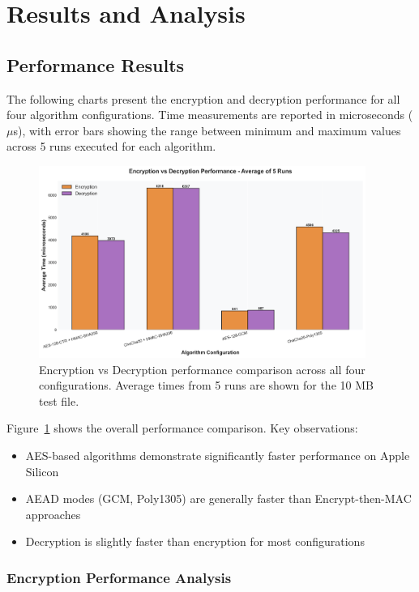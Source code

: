 \documentclass[12pt,a4paper]{article}
\begin{document}
\section{Results and Analysis}

\subsection{Performance Results}

The following charts present the encryption and decryption performance for all four algorithm configurations. Time measurements are reported in microseconds ($\mu$s), with error bars showing the range between minimum and maximum values across 5 runs executed for each algorithm.

\begin{figure}[h]
\centering
\includegraphics[width=0.95\textwidth]{performance_comparison.png}
\caption{Encryption vs Decryption performance comparison across all four configurations. Average times from 5 runs are shown for the 10 MB test file.}
\label{fig:perf_comparison}
\end{figure}

Figure~\ref{fig:perf_comparison} shows the overall performance comparison. Key observations:
\begin{itemize}
    \item AES-based algorithms demonstrate significantly faster performance on Apple Silicon
    \item AEAD modes (GCM, Poly1305) are generally faster than Encrypt-then-MAC approaches
    \item Decryption is slightly faster than encryption for most configurations
\end{itemize}

\subsubsection{Encryption Performance Analysis}
\end{document}
